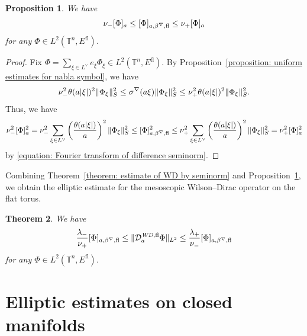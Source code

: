 \documentclass[a4paper,oneside,12pt]{amsart}
\theoremstyle{plain}
\newtheorem{theorem}{Theorem}[section]
\newtheorem{proposition}[theorem]{Proposition}
\theoremstyle{definition}
\theoremstyle{remark}
\DeclarePairedDelimiter{\abs}{\lvert}{\rvert}
\DeclarePairedDelimiter{\norm}{\lVert}{\rVert}
\DeclarePairedDelimiter{\seminorm}{\lbrack}{\rbrack}
\newcommand{\flattorus}{\mathbb{T}^n}
\newcommand{\Lattice}{L}
\newcommand{\duallattice}[1]{#1^{\vee}}
\newcommand{\Ltwonorm}[2][L^2]{\norm{#2}_{#1}}
\newcommand{\mesoscopicseminorm}[2][a]{\seminorm{#2}_{#1}}
\newcommand{\flatmesoscopicdifferenceseminorm}[3][a]{\seminorm{#3}_{#1,#2,\mathrm{fl}}}
\newcommand{\cutoff}{\beta}
\newcommand{\cutoffnabla}{\cutoff^{\nabla}}
\newcommand{\symbolnabla}{\sigma^{\nabla}}
\newcommand{\flatmesoscopicWilsonDiracoperator}[1][a]{\mathcal{D}_{#1}^{\mathit{WD},\mathrm{fl}}}
\newcommand{\flatmodel}[1]{#1^{\mathrm{fl}}}
\begin{document}
\begin{proposition}\label{proposition: equivalence of seminorms}
  We have
  \begin{equation}
    \nu_- \mesoscopicseminorm{\Phi} \le \flatmesoscopicdifferenceseminorm{\cutoffnabla}{\Phi} \le \nu_+ \mesoscopicseminorm{\Phi}
  \end{equation}
  for any $\Phi \in L^2(\flattorus,\flatmodel{E})$.
\end{proposition}
\begin{proof}
  Fix $\Phi = \sum_{\xi \in \duallattice{\Lattice}} e_{\xi} \Phi_{\xi} \in  L^2(\flattorus,\flatmodel{E})$.
  By Proposition~\ref{proposition: uniform estimates for nabla symbol}, we have
  \begin{equation}
    \nu_-^2 \theta(a\abs{\xi})^2 \norm{\Phi_{\xi}}_S^2 \le \symbolnabla(a\xi) \norm{\Phi_{\xi}}_S^2 \le \nu_+^2 \theta(a\abs{\xi})^2 \norm{\Phi_{\xi}}_S^2.
  \end{equation}
  Thus, we have
  \begin{equation}
     \nu_-^2 \mesoscopicseminorm{\Phi}^2 = \nu_-^2 \sum_{\xi \in \duallattice{\Lattice}} \left(\frac{\theta(a\abs{\xi})}{a}\right)^2 \norm{\Phi_{\xi}}_S^2 \le \flatmesoscopicdifferenceseminorm{\cutoffnabla}{\Phi}^2 \le \nu_+^2 \sum_{\xi \in \duallattice{\Lattice}} \left(\frac{\theta(a\abs{\xi})}{a}\right)^2 \norm{\Phi_{\xi}}_S^2 = \nu_+^2 \mesoscopicseminorm{\Phi}^2
  \end{equation}
  by \eqref{equation: Fourier transform of difference seminorm}.
\end{proof}

Combining Theorem~\ref{theorem: estimate of WD by seminorm} and Proposition~\ref{proposition: equivalence of seminorms}, we obtain the elliptic estimate for the mesoscopic Wilson--Dirac operator on the flat torus.
\begin{theorem}\label{theorem: flat elliptic estimate}
  We have
  \begin{equation}
    \frac{\lambda_-}{\nu_+} \flatmesoscopicdifferenceseminorm{\cutoffnabla}{\Phi} \le \Ltwonorm{\flatmesoscopicWilsonDiracoperator \Phi} \le \frac{\lambda_+}{\nu_-} \flatmesoscopicdifferenceseminorm{\cutoffnabla}{\Phi}
  \end{equation}
  for any $\Phi \in L^2(\flattorus,\flatmodel{E})$.
\end{theorem}

\section{Elliptic estimates on closed manifolds}\label{section: Elliptic estimates on closed manifolds}
\end{document}
